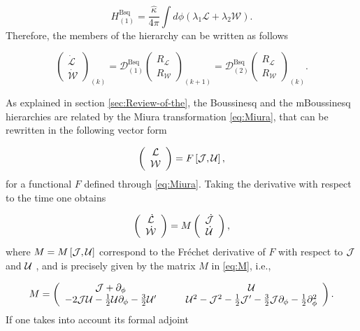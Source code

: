 \documentclass[letterpaper,11pt,oneside]{book}
\begin{document}
\[
H_{\left(1\right)}^{\text{Bsq}}=\frac{\hat{\kappa}}{4\pi}\int d\phi\left(\lambda_{1}\mathcal{L}+\lambda_{2}\mathcal{W}\right).
\]
Therefore, the members of the hierarchy can be written as follows

\begin{equation}
	\left(\begin{array}{c}
		\dot{\mathcal{L}}\\
		\dot{\mathcal{W}}
	\end{array}\right)_{\left(k\right)}=\mathcal{D}_{(1)}^{\text{Bsq}}\left(\begin{array}{c}
		R_{\mathcal{L}}\\
		R_{\mathcal{W}}
	\end{array}\right)_{\left(k+1\right)}=\mathcal{D}_{(2)}^{\text{Bsq}}\left(\begin{array}{c}
		R_{\mathcal{L}}\\
		R_{\mathcal{W}}
	\end{array}\right)_{\left(k\right)}.\label{eq:Bq Hierarchy}
\end{equation}

As explained in section \ref{sec:Review-of-the}, the Boussinesq and
the mBoussinesq hierarchies are related by the Miura transformation
\eqref{eq:Miura}, that can be rewritten in the following vector form

\[
\left(\begin{array}{c}
	\mathcal{L}\\
	\mathcal{W}
\end{array}\right)=F\left[{\cal J},{\cal U}\right],
\]
for a functional $F$ defined through \eqref{eq:Miura}. Taking the
derivative with respect to the time one obtains

\begin{equation}
	\left(\begin{array}{c}
		\dot{\mathcal{L}}\\
		\dot{\mathcal{W}}
	\end{array}\right)=M\left(\begin{array}{c}
		\dot{\mathcal{J}}\\
		\dot{{\cal U}}
	\end{array}\right),\label{eq:Miura vector}
\end{equation}
where $M=M\left[{\cal J},{\cal U}\right]$ correspond to the Fréchet
derivative of $F$ with respect to ${\cal J}$ and ${\cal U}$ \cite{Mathieu:1991},
and is precisely given by the matrix $M$ in \eqref{eq:M}, i.e.,

\[
M=\left(\begin{array}{cc}
	{\cal J}+\partial_{\phi}\qquad & \mathcal{U}\\
	-2{\cal J}\mathcal{U}-\frac{1}{2}\mathcal{U}\partial_{\phi}-\frac{3}{2}{\cal U}^{\prime}\qquad & \mathcal{U}^{2}-{\cal J}^{2}-\frac{1}{2}{\cal J}^{\prime}-\frac{3}{2}{\cal J}\partial_{\phi}-\frac{1}{2}\partial_{\phi}^{2}
\end{array}\right).
\]
If one takes into account its formal adjoint
\end{document}
